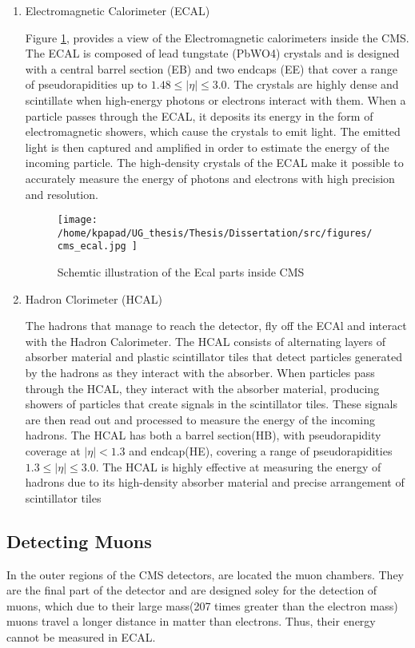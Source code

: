 \begin{enumerate}
\item Electromagnetic Calorimeter (ECAL)
\label{sec:org54126fa}

Figure \ref{fig:cms_ecal}\cite{mac-2014}, provides a view of the Electromagnetic calorimeters inside the CMS. The ECAL is composed of lead tungstate (PbWO4) crystals and is designed with a central barrel section (EB) and two endcaps (EE) that cover a range of pseudorapidities up to \(1.48\leq|\eta| \leq 3.0\)\cite{Biino_2015}. The crystals are highly dense and scintillate when high-energy photons or electrons interact with them. When a particle passes through the ECAL, it deposits its energy in the form of electromagnetic showers, which cause the crystals to emit light. The emitted light is then captured and amplified in order to estimate the energy of the incoming particle. The high-density crystals of the ECAL make it possible to accurately measure the energy of photons and electrons with high precision and resolution. 

\begin{figure}[h]
\centering
\texttt{[image: /home/kpapad/UG\_thesis/Thesis/Dissertation/src/figures/cms\_ecal.jpg ]}
\caption{Schemtic illustration of the Ecal parts inside CMS }
\label{fig:cms_ecal}
\end{figure}


\item Hadron Clorimeter (HCAL)
\label{sec:orgbfeffb5}

The hadrons that manage to reach the detector, fly off the ECAl and interact with the Hadron Calorimeter. The HCAL consists of alternating layers of absorber material and plastic scintillator tiles that detect particles generated by the hadrons as they interact with the absorber.  When particles pass through the HCAL, they interact with the absorber material, producing showers of particles that create signals in the scintillator tiles. These signals are then read out and processed to measure the energy of the incoming hadrons. The HCAL has both a barrel section(HB), with pseudorapidity coverage at \(|\eta|<1.3\) and endcap(HE), covering a range of pseudorapidities \(1.3\leq|\eta| \leq 3.0\). The HCAL is highly effective at measuring the energy of hadrons due to its high-density absorber material and precise arrangement of scintillator tiles\cite{HcalLecture}
\end{enumerate}

\subsection{Detecting Muons}
\label{sec:org8c95f86}
In the outer regions of the CMS detectors, are located the muon chambers. They are the final part of the detector and are designed soley for the detection of muons, which due to their large mass(207 times greater than the electron mass) muons travel a longer distance in matter than electrons. Thus, their energy cannot be measured in ECAL. 


